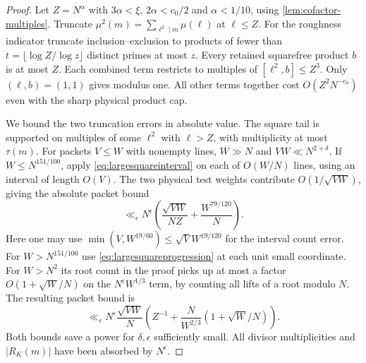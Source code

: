 \documentclass[11pt,a4paper]{article}
\numberwithin{equation}{section}
\begin{document}
\begin{proof}
Let $Z=N^\alpha$ with $3\alpha<\xi$, $2\alpha<c_0/2$ and
$\alpha<1/10$, using \cref{lem:cofactor-multiples}. Truncate
$\mu^2(m)=\sum_{\ell^2\mid m}\mu(\ell)$ at $\ell\le Z$.
For the roughness indicator truncate inclusion--exclusion to
products of fewer than $t=\lfloor\log Z/\log z\rfloor$ distinct
primes at most $z$. Every retained squarefree product $b$ is at
most $Z$. Each combined term restricts to multiples of
$[\ell^2,b]\le Z^3$. Only $(\ell,b)=(1,1)$ gives modulus one.
All other terms together cost $O(Z^2 N^{-c_0})$ even with
the sharp physical product cap.

We bound the two truncation errors in absolute value. The square
tail is supported on multiples of some $\ell^2$ with $\ell>Z$,
with multiplicity at most $\tau(m)$. For packets $V\le W$ with
nonempty lines, $W\gg N$ and $VW\ll N^{2+\delta}$. If
$W\le N^{151/100}$, apply \eqref{eq:largesquareinterval} on
each of $O(W/N)$ lines, using an interval of length $O(V)$.
The two physical test weights contribute $O(1/\sqrt{VW})$,
giving the absolute packet bound
\[
 \ll_\epsilon N^\epsilon
     \left(\frac{\sqrt{VW}}{NZ}+\frac{W^{79/120}}{N}\right).
\]
Here one may use $\min(V,W^{19/60})\le\sqrt V W^{19/120}$
for the interval count error. For $W>N^{151/100}$ use
\eqref{eq:largesquareprogression} at each unit small coordinate.
For $W>N^2$ its root count in the proof picks up at most a factor
$O(1+\sqrt W/N)$ on the $N^\epsilon W^{1/3}$ term, by counting
all lifts of a root modulo $N$. The resulting packet bound is
\[
 \ll_\epsilon N^\epsilon\frac{\sqrt{VW}}{N}
 \left(Z^{-1}+\frac{N}{W^{2/3}}(1+\sqrt W/N)\right).
\]
Both bounds save a power for $\delta,\epsilon$ sufficiently
small. All divisor multiplicities and $|R_K(m)|$ have been
absorbed by $N^\epsilon$.


\end{proof}
\end{document}
